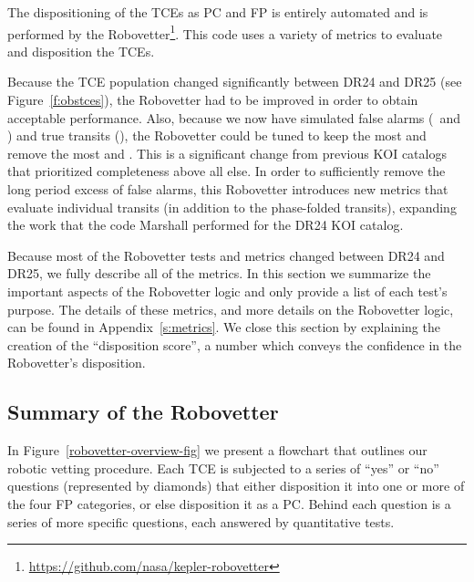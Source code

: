 \label{s:robovetter}
The dispositioning of the TCEs as PC and FP is entirely automated and is performed by the Robovetter\footnote{\label{rvgithub}\url{https://github.com/nasa/kepler-robovetter}}. This code uses a variety of metrics to evaluate and disposition the TCEs.  


Because the TCE population changed significantly between DR24 and DR25 (see Figure~\ref{f:obstces}), the Robovetter had to be improved in order to obtain acceptable performance.  Also, because we now have simulated false alarms (\invtces\ and \scrtces) and true transits (\injtces), the Robovetter could be tuned to keep the most  and remove the most  and . This is a significant change from previous KOI catalogs that prioritized completeness above all else.  In order to sufficiently remove the long period excess of false alarms, this Robovetter introduces new metrics that evaluate individual transits (in addition to the phase-folded transits), expanding the work that the code Marshall \citep{Mullally2016} performed for the DR24 KOI catalog.

Because most of the Robovetter tests and metrics changed between DR24 and DR25, we fully describe all of the metrics.  In this section we summarize the important aspects of the Robovetter logic and only provide a list of each test's purpose. The details of these metrics, and more details on the Robovetter logic, can be found in Appendix~\ref{s:metrics}. We close this section by explaining the creation of the ``disposition score'', a number which conveys the confidence in the Robovetter's disposition.

\subsection{Summary of the Robovetter}

In Figure~\ref{robovetter-overview-fig} we present a flowchart that outlines our robotic vetting procedure. Each TCE is subjected to a series of ``yes'' or ``no'' questions (represented by diamonds) that either disposition it into one or more of the four FP categories, or else disposition it as a PC. Behind each question is a series of more specific questions, each answered by quantitative tests. 


